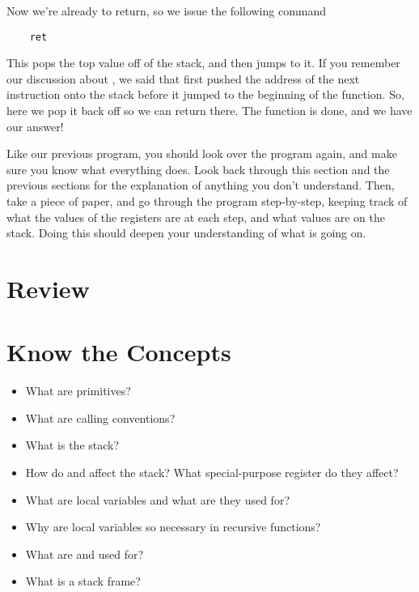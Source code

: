 Now we're already to return, so we issue the following command

\begin{simpletyping}
\begin{lstlisting}
	ret
\end{lstlisting}
\end{simpletyping}

This pops the top value off of the stack, and then jumps to it.  If
you remember our discussion about , we said
that  first pushed the address of the
next instruction onto the stack before it jumped to the beginning
of the function.  So, here we pop it back off so we can return there.
The function is done, and we have our answer!  

Like our previous program, you should look over the
program again, and make sure you know what everything does.
Look back through this section and the previous sections for the 
explanation of anything you don't understand.  Then, take a 
piece of paper, and go through the program
step-by-step, keeping track of what the values of the registers
are at each step, and what values are on the stack.  Doing this
should deepen your understanding of what is going on.

\section{Review}

\section{Know the Concepts}

\begin{itemize}\item What are primitives? 
\item What are calling conventions? 
\item What is the stack? 
\item How do  and  affect the stack?  What special-purpose register do they affect? 
\item What are local variables and what are they used for? 
\item Why are local variables so necessary in recursive functions? 
\item What are {\ebpReg} and {\espReg} used for? 
\item What is a stack frame? 
\end{itemize}

